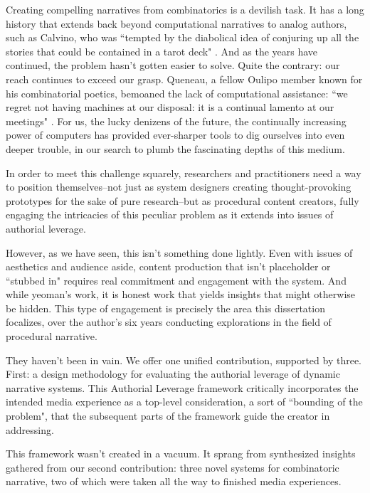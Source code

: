 Creating compelling narratives from combinatorics is a devilish task. It has a long history that extends back beyond computational narratives to analog authors, such as Calvino, who was ``tempted by the diabolical idea of conjuring up all the stories that could be contained in a tarot deck" \cite{crossed_destinies}. And as the years have continued, the problem hasn't gotten easier to solve. Quite the contrary: our reach continues to exceed our grasp. Queneau, a fellow Oulipo member known for his combinatorial poetics, bemoaned the lack of computational assistance: ``we regret not having machines at our disposal: it is a continual lamento at our meetings" \cite[p.~322]{queneau_regret}. For us, the lucky denizens of the future, the continually increasing power of computers has provided ever-sharper tools to dig ourselves into even deeper trouble, in our search to plumb the fascinating depths of this medium.

In order to meet this challenge squarely, researchers and practitioners need a way to position themselves--not just as system designers creating thought-provoking prototypes for the sake of pure research--but as procedural content creators, fully engaging the intricacies of this peculiar problem as it extends into issues of authorial leverage.

However, as we have seen, this isn't something done lightly. Even with issues of aesthetics and audience aside, content production that isn't placeholder or ``stubbed in" requires real commitment and engagement with the system. And while yeoman's work, it is honest work that yields insights that might otherwise be hidden. This type of engagement is precisely the area this dissertation focalizes, over the author's six years conducting explorations in the field of procedural narrative.

They haven't been in vain. We offer one unified contribution, supported by three. First: a design methodology for evaluating the authorial leverage of dynamic narrative systems. This Authorial Leverage framework critically incorporates the intended media experience as a top-level consideration, a sort of ``bounding of the problem", that the subsequent parts of the framework guide the creator in addressing.

This framework wasn't created in a vacuum. It sprang from synthesized insights gathered from our second contribution: three novel systems for combinatoric narrative, two of which were taken all the way to finished media experiences.

